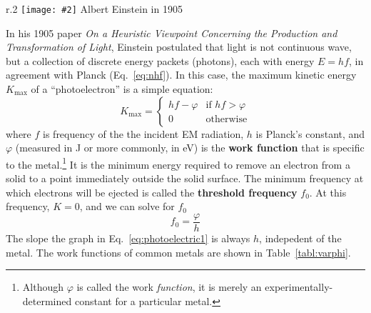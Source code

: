 \documentclass[11pt]{article}
\newcommand{\pic}[2]{\texttt{[image: \#2]}}
\begin{document}
\begin{wrapfigure}{r}{.2\textwidth}
  \centering
  \pic{.2}{../../21-Relativity/graphics/Einstein_patentoffice.png}
  Albert Einstein in 1905
\end{wrapfigure}
In his 1905 paper \emph{On a Heuristic Viewpoint Concerning the Production and
  Transformation of Light}, Einstein postulated that light is not continuous
wave, but a collection of discrete energy packets (photons), each with energy
$E=hf$, in agreement with Planck (Eq.~\ref{eq:nhf}). In this case, the
maximum kinetic energy $K_\mathrm{max}$ of a ``photoelectron'' is a simple
equation:
\begin{equation}
  \boxed{K_\mathrm{max}=
    \begin{cases}
      hf-\varphi & \text{if }hf>\varphi\\
      0          & \text{otherwise}
    \end{cases}
  }
  \label{eq:photoelectric1}
\end{equation}
where $f$ is frequency of the the incident EM radiation, $h$ is Planck's
constant, and $\varphi$ (measured in \si{\joule} or more commonly, in
\si{\electronvolt}) is the \textbf{work function} that is specific to the
metal.\footnote{Although $\varphi$ is called the work \emph{function}, it is
  merely an experimentally-determined constant for a particular metal.}
It is the minimum energy required to remove an electron from a solid to a point
immediately outside the solid surface. The minimum frequency at which electrons
will be ejected is called the \textbf{threshold frequency} $f_0$. At this
frequency, $K=0$, and we can solve for $f_0$
\begin{equation}
  f_0=\frac{\varphi}{h}
\end{equation}
The slope the graph in Eq.~\ref{eq:photoelectric1} is always $h$, indepedent of
the metal. The work functions of common metals are shown in
Table~\ref{tabl:varphi}.
\end{document}
